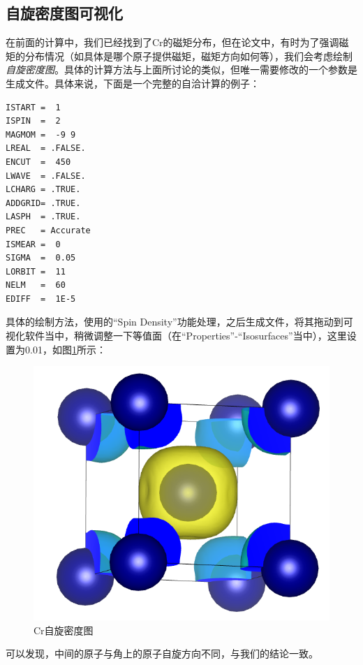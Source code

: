 \subsection{自旋密度图可视化}\label{subsec:磁矩计算-自旋密度图可视化}

在前面的计算中，我们已经找到了Cr的磁矩分布，但在论文中，有时为了强调磁矩的分布情况（如具体是哪个原子提供磁矩，磁矩方向如何等），我们会考虑绘制\emph{自旋密度图}。具体的计算方法与上面所讨论的类似，但唯一需要修改的一个参数是生成文件。具体来说，下面是一个完整的自洽计算的例子：

\begin{lstlisting}[caption=INCAR]
ISTART =  1
ISPIN  =  2
MAGMOM =  -9 9
LREAL  = .FALSE.
ENCUT  =  450
LWAVE  = .FALSE.
LCHARG = .TRUE.
ADDGRID= .TRUE.
LASPH  = .TRUE.
PREC   = Accurate
ISMEAR =  0
SIGMA  =  0.05
LORBIT =  11
NELM   =  60
EDIFF  =  1E-5
\end{lstlisting}

具体的绘制方法，使用的“Spin Density”功能处理，之后生成文件，将其拖动到可视化软件当中，稍微调整一下等值面（在“Properties”-“Isosurfaces”当中），这里设置为0.01，如图\ref{fig:磁矩计算-Cr自旋密度图}所示：

\begin{figure}
    \centering
    \includegraphics[width=0.7\linewidth]{VASP计算/静态自洽与电荷密度/磁矩计算/fig/Cr自旋密度图.png}
    \caption{Cr自旋密度图}
    \label{fig:磁矩计算-Cr自旋密度图}
\end{figure}

可以发现，中间的原子与角上的原子自旋方向不同，与我们的结论一致。





